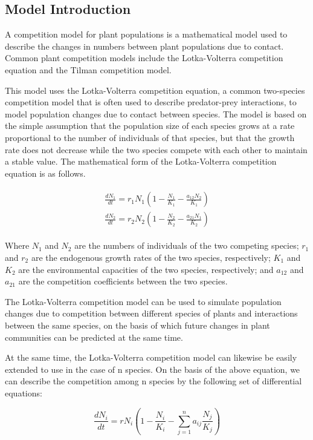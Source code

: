 \documentclass[12pt]{article}
\begin{document}
\subsection{Model Introduction}

A competition model for plant populations is a mathematical model used to describe the changes in numbers between plant populations due to contact. Common plant competition models include the Lotka-Volterra competition equation and the Tilman competition model.

This model uses the Lotka-Volterra competition equation, a common two-species competition model that is often used to describe predator-prey interactions, to model population changes due to contact between species. The model is based on the simple assumption that the population size of each species grows at a rate proportional to the number of individuals of that species, but that the growth rate does not decrease while the two species compete with each other to maintain a stable value. The mathematical form of the Lotka-Volterra competition equation is as follows.

\begin{align}
	\begin{aligned}
		\frac{dN_1}{dt} = r_1 N_1(1-\frac{N_1}{K_1} - \frac{a_{12}N_2}{K_1}) \\
		\frac{dN_2}{dt} = r_2 N_2(1-\frac{N_2}{K_2} - \frac{a_{21}N_1}{K_2})
	\end{aligned}
\end{align}


Where $N_1$ and $N_2$ are the numbers of individuals of the two competing species; $r_1$ and $r_2$ are the endogenous growth rates of the two species, respectively; $K_1$ and $K_2$ are the environmental capacities of the two species, respectively; and $a_{12}$ and $a_{21}$ are the competition coefficients between the two species.

The Lotka-Volterra competition model can be used to simulate population changes due to competition between different species of plants and interactions between the same species, on the basis of which future changes in plant communities can be predicted at the same time.

At the same time, the Lotka-Volterra competition model can likewise be easily extended to use in the case of n species. On the basis of the above equation, we can describe the competition among n species by the following set of differential equations:

\begin{equation}
	\frac{dN_i}{dt} = r N_i(1-\frac{N_i}{K_i} - \sum_{j=1}^n a_{ij} \frac{N_j}{K_j})
\end{equation}
\end{document}
